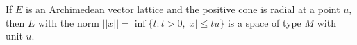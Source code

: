 If $E$ is an Archimedean vector lattice and the positive cone is radial at a point $u$, then $E$ with the norm $||x|| = \inf \{t : t > 0, |x| \leq tu\}$ is a space of type $M$ with unit $u$.
